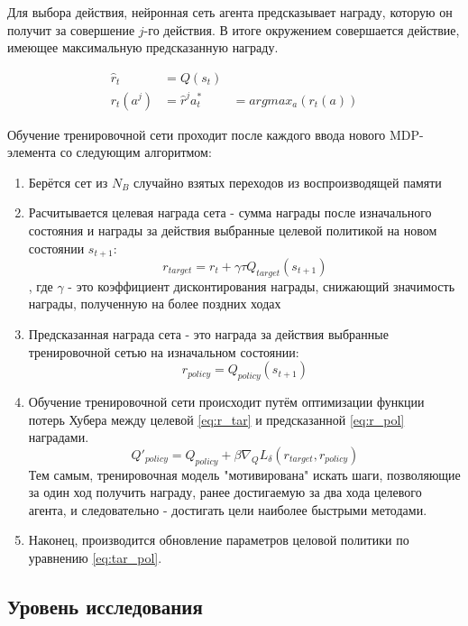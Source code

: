 Для выбора действия, нейронная сеть агента предсказывает награду, которую он получит за совершение $j$-го действия.
В итоге окружением совершается действие, имеющее максимальную предсказанную награду.

\begin{align*}
	\textbf{$\hat r_t$} &= Q(\textbf{$s_t$}) \\
	r_t(a^j) &= \hat r^j
	a^*_t &= argmax_a (r_t(a))
\end{align*}
 
Обучение тренировочной сети проходит после каждого ввода нового MDP-элемента со следующим алгоритмом:
\begin{enumerate}
\item Берётся сет из $N_B$ случайно взятых переходов из воспроизводящей памяти
\item Расчитывается целевая награда сета - сумма награды после изначального состояния и награды 
	за действия выбранные целевой политикой на новом состоянии $s_{t+1}$:
	\begin{equation}
	\label{eq:r_tar}
	r_{target} = r_t + \gamma \tau Q_{target}(s_{t+1})
	\end{equation}
	, где $\gamma$ - это коэффициент дисконтирования награды, снижающий значимость 
	награды, полученную на более поздних ходах 
\item Предсказанная награда сета - это награда за действия выбранные тренировочной сетью 
		на изначальном состоянии:
	\begin{equation}
	\label{eq:r_pol}
	r_{policy} = Q_{policy}(s_{t+1})
	\end{equation}	
\item 
	Обучение тренировочной сети происходит путём оптимизации функции потерь Хубера между целевой
	\eqref{eq:r_tar} и предсказанной \eqref{eq:r_pol} наградами.
	\begin{equation}
	Q'_{policy} = Q_{policy} + \beta \nabla_Q L_{\delta}(r_{target}, r_{policy})
	\end{equation}
	Тем самым, тренировочная модель "мотивирована" искать шаги, позволяющие за один ход получить 
	награду, ранее достигаемую за два хода целевого агента, и следовательно - достигать цели 
	наиболее быстрыми методами.
\item Наконец, производится обновление параметров целовой политики по уравнению \eqref{eq:tar_pol}.
\end{enumerate}

\subsection{Уровень исследования}

